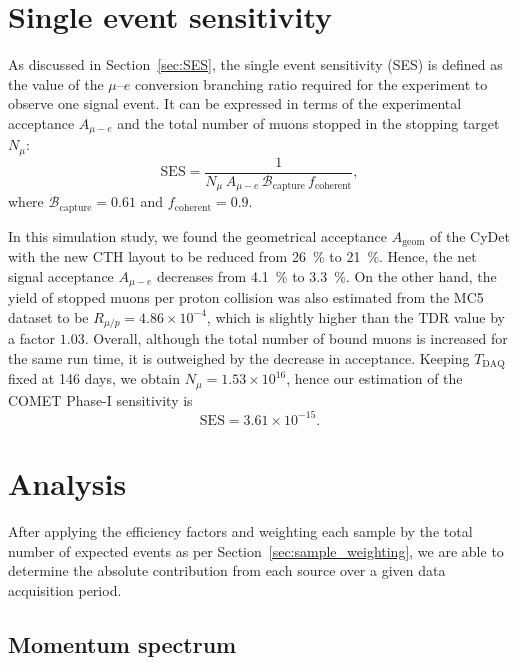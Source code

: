 \section{Single event sensitivity}
As discussed in Section~\ref{sec:SES}, the single event sensitivity (SES) is
defined as the value of the $\mu$--$e$ conversion branching ratio required for
the experiment to observe one signal event. It can be expressed in terms of the
experimental acceptance $A_{\mu-e}$ and the total number of muons stopped in the
stopping target $N_\mu$:
\begin{equation*}
\mathrm{SES} = 
\frac{1}{N_\mu\,A_{\mu-e}\,\mathcal{B}_\mathrm{capture}\,f_\mathrm{coherent}},
\end{equation*}
where $\mathcal{B}_\mathrm{capture} = 0.61$ and $f_\mathrm{coherent} = 0.9$.

In this simulation study, we found the geometrical acceptance $A_\mathrm{geom}$
of the CyDet with the new CTH layout to be reduced from \SI{26}{\percent} to
\SI{21}{\percent}. Hence, the net signal acceptance $A_{\mu-e}$ decreases from
\SI{4.1}{\percent} to \SI{3.3}{\percent}. On the other hand, the yield of
stopped muons per proton collision was also estimated from the MC5 dataset to be
$R_{\mu / p} = 4.86 \times 10^{-4}$, which is slightly higher than the TDR value
by a factor $1.03$. Overall, although the total number of bound muons is
increased for the same run time, it is outweighed by the decrease in acceptance.
Keeping $T_\mathrm{DAQ}$ fixed at 146 days, we obtain $N_\mu = 1.53 \times
10^{16}$, hence our estimation of the COMET Phase-I sensitivity is
$$
\mathrm{SES} = 3.61 \times 10^{-15}.
$$


\section{Analysis}

After applying the efficiency factors and weighting each sample by the total
number of expected events as per Section~\ref{sec:sample_weighting}, we are able
to determine the absolute contribution from each source over a given data
acquisition period.

\subsection{Momentum spectrum} %

